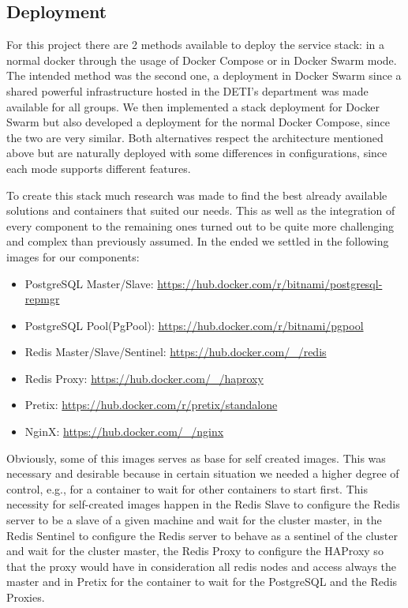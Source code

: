 \documentclass[12pt]{article}
\begin{document}
\subsection{Deployment} \label{strategy.deployment} %


For this project there are 2 methods available to deploy the service stack: in a normal docker through the usage of Docker Compose or in Docker Swarm mode. The intended method was the second one, a deployment in Docker Swarm since a shared powerful infrastructure hosted in the DETI's department was made available for all groups. We then implemented a stack deployment for Docker Swarm but also developed a deployment for the normal Docker Compose, since the two are very similar. Both alternatives respect the architecture mentioned above but are naturally deployed with some differences in configurations, since each mode supports different features.

To create this stack much research was made to find the best already available solutions and containers that suited our needs. This as well as the integration of every component to the remaining ones turned out to be quite more challenging and complex than previously assumed. In the ended we settled in the following images for our components:

\begin{itemize}
  \item PostgreSQL Master/Slave: \url{https://hub.docker.com/r/bitnami/postgresql-repmgr}
  \item PostgreSQL Pool(PgPool): \url{https://hub.docker.com/r/bitnami/pgpool}
  \item Redis Master/Slave/Sentinel: \url{https://hub.docker.com/_/redis}
  \item Redis Proxy: \url{https://hub.docker.com/_/haproxy}
  \item Pretix: \url{https://hub.docker.com/r/pretix/standalone}
  \item NginX: \url{https://hub.docker.com/_/nginx}
\end{itemize}

Obviously, some of this images serves as base for self created images. This was necessary and desirable because in certain situation we needed a higher degree of control, e.g., for a container to wait for other containers to start first. This necessity for self-created images happen in the Redis Slave to configure the Redis server to be a slave of a given machine and wait for the cluster master, in the Redis Sentinel to configure the Redis server to behave as a sentinel of the cluster and wait for the cluster master, the Redis Proxy to configure the HAProxy so that the proxy would have in consideration all redis nodes and access always the master and in Pretix for the container to wait for the PostgreSQL and the Redis Proxies.
\end{document}
